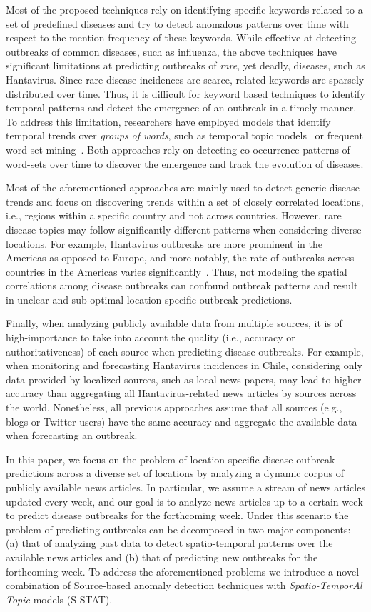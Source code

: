 \documentclass[conference]{IEEEtran}
\newcommand{\fullmodel}{{S-STAT}\xspace}
\begin{document}
Most of the proposed techniques rely on identifying specific keywords related to a set of predefined diseases and try to detect anomalous patterns over time with respect to the mention frequency of these keywords. While effective at detecting outbreaks of common diseases, such as influenza, the above techniques have significant limitations at predicting outbreaks of {\em rare}, yet deadly, diseases, such as Hantavirus. Since rare disease incidences are scarce, related keywords are sparsely distributed over time. Thus, it is difficult for keyword based techniques to identify temporal patterns and detect the emergence of an outbreak in a timely manner. To address this limitation, researchers have employed models that identify temporal trends over {\em groups of words}, such as temporal topic models~\cite{paul:11} or frequent word-set mining~\cite{parker:13}. Both approaches rely on detecting co-occurrence patterns of word-sets over time to discover the emergence and track the evolution of diseases. 

Most of the aforementioned approaches are mainly used to detect generic disease trends and focus on discovering trends within a set of closely correlated locations, i.e., regions within a specific country and not across countries. However, rare disease topics may follow significantly different patterns when considering diverse locations. For example, Hantavirus outbreaks are more prominent in the Americas as opposed to Europe, and more notably, the rate of outbreaks across countries in the Americas varies significantly~\cite{jonsson:10}. Thus, not modeling the spatial correlations among disease outbreaks can confound outbreak patterns and result in unclear and sub-optimal location specific outbreak predictions. 

Finally, when analyzing publicly available data from multiple sources, it is of high-importance to take into account the quality (i.e., accuracy or authoritativeness) of each source when predicting disease outbreaks. For example, when monitoring and forecasting Hantavirus incidences in Chile, considering only data provided by localized sources, such as local news papers, may lead to higher accuracy than aggregating all Hantavirus-related news articles by sources across the world. Nonetheless, all previous approaches assume that all sources (e.g., blogs or Twitter users) have the same accuracy and aggregate the available data when forecasting an outbreak. 

In this paper, we focus on the problem of location-specific disease outbreak predictions across a diverse set of locations by analyzing a dynamic corpus of publicly available news articles. In particular, we assume a stream of news articles updated every week, and our goal is to analyze news articles up to a certain week to predict disease outbreaks for the forthcoming week. Under this scenario the problem of predicting outbreaks can be decomposed in two major components: (a) that of analyzing past data to detect spatio-temporal patterns over the available news articles and (b) that of predicting new outbreaks for the forthcoming week. To address the aforementioned problems we introduce a novel combination of Source-based anomaly detection techniques with {\em Spatio-TemporAl Topic} models (\fullmodel).
\end{document}
